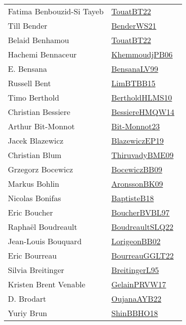 {\begin{longtable}{p{4cm}p{20cm}}
Fatima Benbouzid{-}Si Tayeb & \href{works/TouatBT22.pdf}{TouatBT22}~\cite{TouatBT22}\\
Till Bender & \href{works/BenderWS21.pdf}{BenderWS21}~\cite{BenderWS21}\\
Belaid Benhamou & \href{works/TouatBT22.pdf}{TouatBT22}~\cite{TouatBT22}\\
Hachemi Bennaceur & \href{works/KhemmoudjPB06.pdf}{KhemmoudjPB06}~\cite{KhemmoudjPB06}\\
E. Bensana & \href{works/BensanaLV99.pdf}{BensanaLV99}~\cite{BensanaLV99}\\
Russell Bent & \href{works/LimBTBB15.pdf}{LimBTBB15}~\cite{LimBTBB15}\\
Timo Berthold & \href{works/BertholdHLMS10.pdf}{BertholdHLMS10}~\cite{BertholdHLMS10}\\
Christian Bessiere & \href{works/BessiereHMQW14.pdf}{BessiereHMQW14}~\cite{BessiereHMQW14}\\
Arthur Bit{-}Monnot & \href{works/Bit-Monnot23.pdf}{Bit-Monnot23}~\cite{Bit-Monnot23}\\
Jacek Blazewicz & \href{}{BlazewiczEP19}~\cite{BlazewiczEP19}\\
Christian Blum & \href{works/ThiruvadyBME09.pdf}{ThiruvadyBME09}~\cite{ThiruvadyBME09}\\
Grzegorz Bocewicz & \href{works/BocewiczBB09.pdf}{BocewiczBB09}~\cite{BocewiczBB09}\\
Markus Bohlin & \href{works/AronssonBK09.pdf}{AronssonBK09}~\cite{AronssonBK09}\\
Nicolas Bonifas & \href{works/BaptisteB18.pdf}{BaptisteB18}~\cite{BaptisteB18}\\
Eric Boucher & \href{}{BoucherBVBL97}~\cite{BoucherBVBL97}\\
Rapha{\"{e}}l Boudreault & \href{works/BoudreaultSLQ22.pdf}{BoudreaultSLQ22}~\cite{BoudreaultSLQ22}\\
Jean{-}Louis Bouquard & \href{works/LorigeonBB02.pdf}{LorigeonBB02}~\cite{LorigeonBB02}\\
Eric Bourreau & \href{works/BourreauGGLT22.pdf}{BourreauGGLT22}~\cite{BourreauGGLT22}\\
Silvia Breitinger & \href{}{BreitingerL95}~\cite{BreitingerL95}\\
Kristen Brent Venable & \href{works/GelainPRVW17.pdf}{GelainPRVW17}~\cite{GelainPRVW17}\\
D. Brodart & \href{works/OujanaAYB22.pdf}{OujanaAYB22}~\cite{OujanaAYB22}\\
Yuriy Brun & \href{works/ShinBBHO18.pdf}{ShinBBHO18}~\cite{ShinBBHO18}\\

\end{longtable}}
